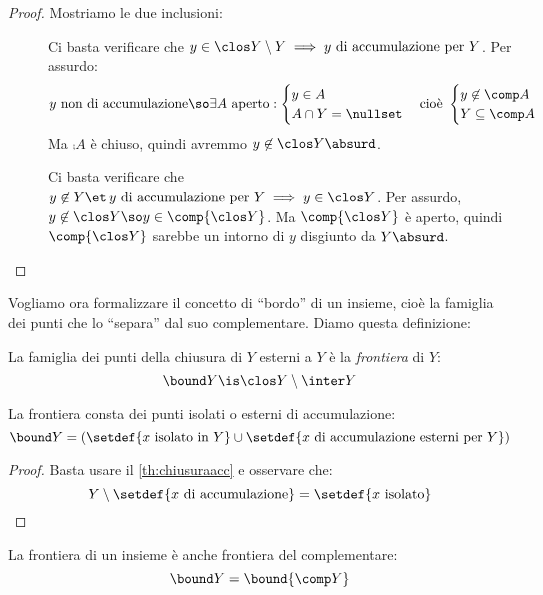 \begin{proof}
	Mostriamo le due inclusioni:
	\begin{description}
		\item[\proofsubseteq]
		Ci basta verificare che $y\in\clos Y\setminus Y\implies y\text{ di accumulazione per }Y$.
		Per assurdo:
		\[y\text{ non di accumulazione}\so
		\exists A\text{ aperto}:
		\begin{cases}
			y\in A\\
			A\cap Y=\nullset
		\end{cases}\text{cioè }
		\begin{cases}
			y\not\in\comp A\\
			Y\subseteq\comp A
		\end{cases}\]
		Ma $\comp A$ è chiuso, quindi avremmo $y\not\in\clos Y\absurd$.
		\item[\proofsupseteq]
		Ci basta verificare che $y\not\in Y\et\, y\text{ di accumulazione per }Y\implies y\in\clos Y$.
		Per assurdo, $y\not\in\clos Y\so y\in\comp{\clos Y}$. Ma $\comp{\clos Y}$ è aperto, quindi $\comp{\clos Y}$ sarebbe un intorno di $y$ disgiunto da $Y\absurd$. \qedhere
	\end{description}
\end{proof}

Vogliamo ora formalizzare il concetto di ``bordo'' di un insieme, cioè la famiglia dei punti che lo ``separa'' dal suo complementare. Diamo questa definizione:

\begin{defn}[Frontiera]
	La famiglia dei punti della chiusura di $Y$ esterni a $Y$ è la \emph{frontiera} di $Y$:
	\[\bound Y\is\clos Y\setminus\inter Y\]
\end{defn}

\begin{prop}
	La frontiera consta dei punti isolati o esterni di accumulazione:
	\[\bound Y=(\setdef{x\text{ isolato in }Y}\cup\setdef{x\text{ di accumulazione esterni per }Y})\]
\end{prop}

\begin{proof}
	Basta usare il \autoref{th:chiusuraacc} e osservare che:
	\[Y\setminus\setdef{x\text{ di accumulazione}}=\setdef{x\text{ isolato}} \qedhere\]
\end{proof}

\begin{prop}
	La frontiera di un insieme è anche frontiera del complementare:
	\[\bound Y=\bound{\comp Y}\]
\end{prop}

